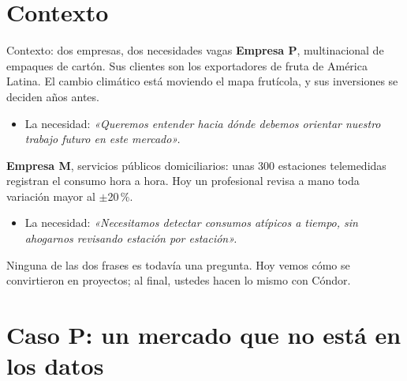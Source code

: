 \documentclass{beamer}
\begin{document}
\section{Contexto}

\begin{frame}{Contexto: dos empresas, dos necesidades vagas}
\small
\textbf{Empresa P}, multinacional de empaques de cartón. Sus clientes son los exportadores de fruta de América Latina. El cambio climático está moviendo el mapa frutícola, y sus inversiones se deciden años antes.
\begin{itemize}
  \item La necesidad: \emph{«Queremos entender hacia dónde debemos orientar nuestro trabajo futuro en este mercado».}
\end{itemize}

\vspace{0.15cm}
\textbf{Empresa M}, servicios públicos domiciliarios: unas 300 estaciones telemedidas registran el consumo hora a hora. Hoy un profesional revisa a mano toda variación mayor al $\pm$20\,\%.
\begin{itemize}
  \item La necesidad: \emph{«Necesitamos detectar consumos atípicos a tiempo, sin ahogarnos revisando estación por estación».}
\end{itemize}

\vspace{0.15cm}
Ninguna de las dos frases es todavía una pregunta. Hoy vemos cómo se convirtieron en proyectos; al final, ustedes hacen lo mismo con Cóndor.
\end{frame}

\section{Caso P: un mercado que no está en los datos}
\end{document}
